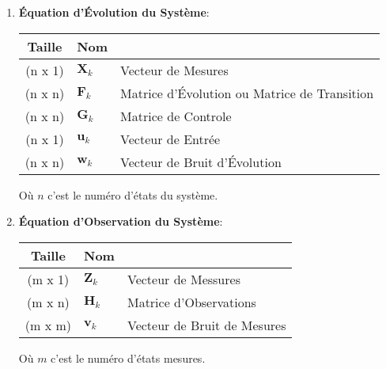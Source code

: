 \documentclass{article}
\begin{document}
\begin{enumerate}
    \item \textbf{Équation d'Évolution du Système}:
    \begin{table}[H]
        \centering\begin{tabular}{c | l l}
            Taille  & Nom & 
            \\\hline
            (n x 1) & $\mathbf{X}_{k}$ & Vecteur de Mesures\\
            (n x n) & $\mathbf{F}_{k}$ & Matrice d'Évolution ou Matrice de Transition\\
            (n x n) & $\mathbf{G}_{k}$ & Matrice de Controle\\
            (n x 1) & $\mathbf{u}_{k}$ & Vecteur de Entrée\\
            (n x n) & $\mathbf{w}_{k}$ & Vecteur de Bruit d'Évolution
            \\\hline
        \end{tabular}
    \end{table}
    Où $n$ c'est le numéro d'états du système.
    \item \textbf{Équation d'Observation du Système}:
    \begin{table}[H]
        \centering\begin{tabular}{c | l l}
            Taille  & Nom & 
            \\\hline
            (m x 1) & $\mathbf{Z}_{k}$ & Vecteur de Messures\\
            (m x n) & $\mathbf{H}_{k}$ & Matrice d'Observations\\
            (m x m) & $\mathbf{v}_{k}$ & Vecteur de Bruit de Mesures
            \\\hline
        \end{tabular}
    \end{table}
    Où $m$ c'est le numéro d'états mesures.
\end{enumerate}
\end{document}
